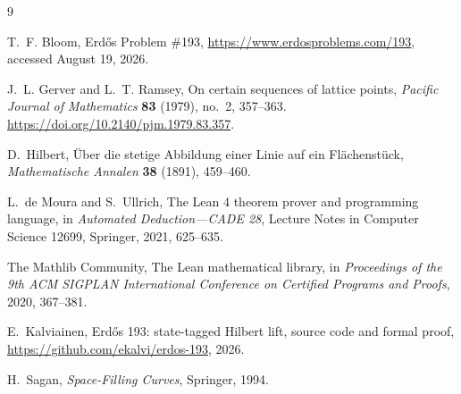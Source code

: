 \documentclass[11pt]{article}
\theoremstyle{definition}
\theoremstyle{remark}
\begin{document}
\begin{thebibliography}{9}

T.~F. Bloom,
\newblock Erd\H{o}s Problem \#193,
\newblock \url{https://www.erdosproblems.com/193}, accessed August 19, 2026.

J.~L. Gerver and L.~T. Ramsey,
\newblock On certain sequences of lattice points,
\newblock \emph{Pacific Journal of Mathematics} \textbf{83} (1979), no.~2,
357--363.
\newblock \url{https://doi.org/10.2140/pjm.1979.83.357}.

D.~Hilbert,
\newblock \"Uber die stetige Abbildung einer Linie auf ein Fl\"achenst\"uck,
\newblock \emph{Mathematische Annalen} \textbf{38} (1891), 459--460.

L.~de Moura and S.~Ullrich,
\newblock The Lean 4 theorem prover and programming language,
\newblock in \emph{Automated Deduction---CADE 28}, Lecture Notes in Computer
Science 12699, Springer, 2021, 625--635.

The Mathlib Community,
\newblock The Lean mathematical library,
\newblock in \emph{Proceedings of the 9th ACM SIGPLAN International Conference
on Certified Programs and Proofs}, 2020, 367--381.

E.~Kalviainen,
\newblock Erd\H{o}s 193: state-tagged Hilbert lift, source code and formal
proof,
\newblock \url{https://github.com/ekalvi/erdos-193}, 2026.

H.~Sagan,
\newblock \emph{Space-Filling Curves},
\newblock Springer, 1994.

\end{thebibliography}
\end{document}

